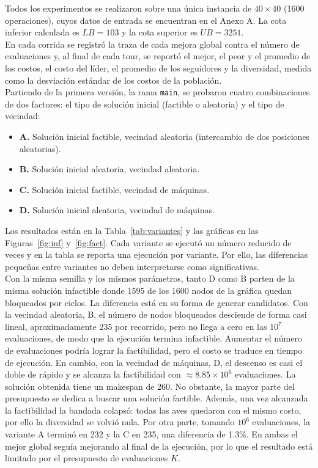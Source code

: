 \documentclass[9pt,a4paper,twocolumn,twoside]{rho-class/rho}
\begin{document}
Todos los experimentos se realizaron sobre una única instancia de $40 \times 40$ (1600 operaciones), cuyos datos de entrada se
encuentran en el Anexo A. La cota inferior calculada es $LB = 103$ y la cota superior es $UB = 3251$. \\

En cada corrida se registró la traza de cada mejora global contra el número de evaluaciones y, al final de cada tour, se reportó el mejor, el peor y el
promedio de los costos, el costo del líder, el promedio de los seguidores y la diversidad, medida como la desviación estándar de los costos de la población. \\

Partiendo de la primera versión, la rama \texttt{main}, se probaron cuatro combinaciones de dos factores: el tipo de solución inicial (factible o aleatoria) y 
el tipo de vecindad:\\
\begin{itemize}
    \item \textbf{A.} Solución inicial factible, vecindad aleatoria (intercambio de dos posiciones aleatorias).
    \item \textbf{B.} Solución inicial aleatoria, vecindad aleatoria.
    \item \textbf{C.} Solución inicial factible, vecindad de máquinas.
    \item \textbf{D.} Solución inicial aleatoria, vecindad de máquinas.
\end{itemize}

Los resultados están en la Tabla~\ref{tab:variantes} y las gráficas en las Figuras~\ref{fig:inf} y~\ref{fig:fact}. Cada variante se ejecutó
un número reducido de veces y en la tabla se reporta una ejecución por variante. Por ello, las diferencias pequeñas entre variantes no deben interpretarse como significativas.\\

Con la misma semilla y los mismos parámetros, tanto D como B parten de la misma solución infactible donde 1595 de los 1600 nodos de la gráfica
quedan bloqueados por ciclos. La diferencia está en su forma de generar candidatos. Con la vecindad aleatoria, B, el número de nodos bloqueados desciende
de forma casi lineal, aproximadamente 235 por recorrido, pero no llega a cero en las $10^7$ evaluaciones, de modo que la ejecución termina infactible. Aumentar el número de
evaluaciones podría lograr la factibilidad, pero el costo se traduce en tiempo de ejecución. En cambio, con la vecindad de máquinas, D, el descenso es 
casi el doble de rápido y se alcanza la factibilidad con $\approx 8.85\times 10^6$ evaluaciones. La solución obtenida tiene un makespan de 260. No obstante, la mayor
parte del presupuesto se dedica a buscar una solución factible. Además, una vez alcanzada la factibilidad la bandada colapsó: todas las aves quedaron 
con el mismo costo, por ello la diversidad se volvió nula. Por otra parte, tomando $10^6$ evaluaciones, la variante A terminó en 232 y la C en 235, una diferencia
de 1.3\%. En ambas el mejor global seguía mejorando al final de la ejecución, por lo que el resultado está limitado por el presupuesto de evaluaciones $K$.\\
\end{document}
